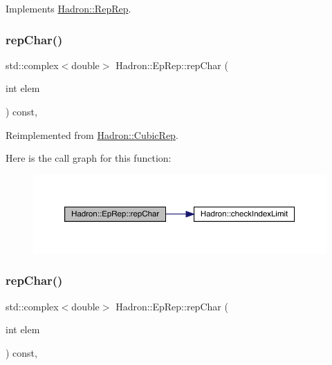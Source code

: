 Implements \mbox{\hyperlink{structHadron_1_1RepRep_ab3213025f6de249f7095892109575fde}{Hadron\+::\+Rep\+Rep}}.

\mbox{\label{structHadron_1_1EpRep_a87fd401f4263b709af08948c9452a717}} 
\subsubsection{\texorpdfstring{repChar()}{repChar()}\hspace{0.1cm}{\footnotesize\ttfamily [1/3]}}
{\footnotesize\ttfamily std\+::complex$<$double$>$ Hadron\+::\+Ep\+Rep\+::rep\+Char (\begin{DoxyParamCaption}\item[{int}]{elem }\end{DoxyParamCaption}) const\hspace{0.3cm}{\ttfamily [inline]}, {\ttfamily [virtual]}}



Reimplemented from \mbox{\hyperlink{structHadron_1_1CubicRep_af45227106e8e715e84b0af69cd3b36f8}{Hadron\+::\+Cubic\+Rep}}.

Here is the call graph for this function\+:
\nopagebreak
\begin{figure}[H]
\begin{center}
\leavevmode
\includegraphics[width=350pt]{d7/da2/structHadron_1_1EpRep_a87fd401f4263b709af08948c9452a717_cgraph}
\end{center}
\end{figure}
\mbox{\label{structHadron_1_1EpRep_a87fd401f4263b709af08948c9452a717}} 
\subsubsection{\texorpdfstring{repChar()}{repChar()}\hspace{0.1cm}{\footnotesize\ttfamily [2/3]}}
{\footnotesize\ttfamily std\+::complex$<$double$>$ Hadron\+::\+Ep\+Rep\+::rep\+Char (\begin{DoxyParamCaption}\item[{int}]{elem }\end{DoxyParamCaption}) const\hspace{0.3cm}{\ttfamily [inline]}, {\ttfamily [virtual]}}



